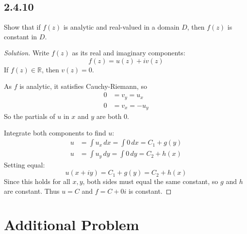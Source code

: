 \documentclass{article}
\newenvironment{solution}{
\begin{proof}[Solution]}{
\end{proof}}
\begin{document}
\subsection*{2.4.10}
Show that if $f(z)$ is analytic and real-valued in a domain $D$, then $f(z)$ is
constant in $D$.
\begin{solution}
  Write $f(z)$ as its real and imaginary components:
  \[
    f(z) = u(z) + iv(z)
  \]
  If $f(z) \in \mathbb{R}$, then $v(z) = 0$.

  As $f$ is analytic, it satisfies Cauchy-Riemann, so
  \begin{align*}
    0 &= v_y = u_x
    \\ 0 &= v_x = -u_y
  \end{align*}
  So the partials of $u$ in $x$ and $y$ are both $0$.

  Integrate both components to find $u$:
  \begin{align*}
    u &= \int u_x \, dx = \int 0 \, dx = C_1 + g(y)
    \\ u &= \int u_y \, dy = \int 0 \, dy = C_2 + h(x)
  \end{align*}
  Setting equal:
  \[
    u(x + iy) = C_1 + g(y) = C_2 + h(x)
  \]
  Since this holds for all $x, y$, both sides must equal the same constant, so $g$
  and $h$ are constant. Thus $u = C$ and $f = C + 0i$ is constant.
\end{solution}

\section*{Additional Problem}
\end{document}
